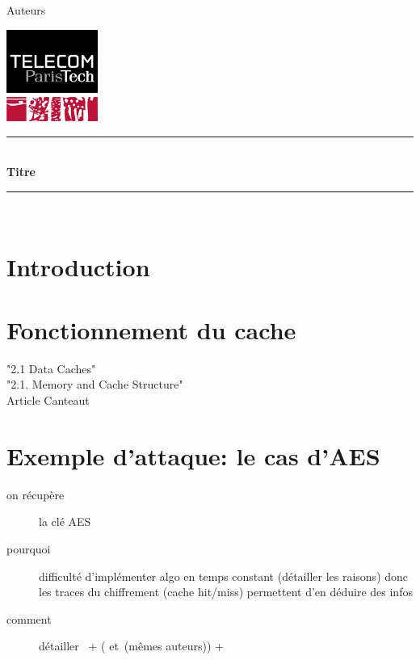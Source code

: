 \documentclass[a4paper,11pt]{article}
\newcommand{\HRule}{\rule{\linewidth}{0.5mm}}
\newcommand{\reporttitle}{Titre}
\newcommand{\reportauthor}{Auteurs}
\begin{document}
	

\begin{center}

\begin{minipage}[t]{0.4\textwidth}
  \begin{flushleft} \large
    \reportauthor
  \vfill
  \end{flushleft}
\end{minipage}
\begin{minipage}[t]{0.5\textwidth}
  \begin{flushright}
  \includegraphics [width=30mm]{figures/tpt.jpg} \\[0.5cm]
  \end{flushright}
\end{minipage}
\HRule \\[0.5cm]
{\huge \bfseries \reporttitle}\\[0.3cm]
\HRule \\[1.5cm]

\end{center}

\section*{Introduction}

\section{Fonctionnement du cache}

"2.1 Data Caches"~\cite{brumley2009cache}\\
"2.1. Memory and Cache Structure"~\cite{tromer2010efficient}\\
Article Canteaut~\cite{canteaut2006understanding}

\section{Exemple d'attaque: le cas d'AES}

\begin{description}
\item[on récupère] la clé AES
\item[pourquoi] difficulté d'implémenter algo en temps constant (détailler les raisons) donc les traces du chiffrement (cache hit/miss) permettent d'en déduire des infos
\item[comment] détailler~\cite{bernstein2005cache} + (\cite{tromer2010efficient} et~\cite{osvik2006cache}(mêmes auteurs)) + ~\cite{canteaut2006understanding}
\end{description}
\end{document}
